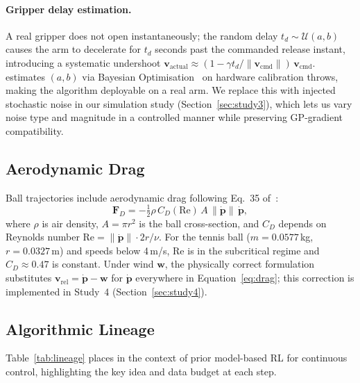 \paragraph{Gripper delay estimation.}
A real gripper does not open instantaneously; the random delay $t_d \sim \mathcal{U}(a,b)$
causes the arm to decelerate for $t_d$ seconds past the commanded release instant,
introducing a systematic undershoot $\mathbf{v}_{\mathrm{actual}} \approx
(1 - \gamma t_d / \|\mathbf{v}_{\mathrm{cmd}}\|)\,\mathbf{v}_{\mathrm{cmd}}$.
\mcpilot{} estimates $(a, b)$ via Bayesian Optimisation~\cite{shahriari2016bo} on
hardware calibration throws, making the algorithm deployable on a real arm.
We replace this with injected stochastic noise in our simulation study
(Section~\ref{sec:study3}), which lets us vary noise type and magnitude in a controlled
manner while preserving GP-gradient compatibility.

\subsection{Aerodynamic Drag}
\label{sec:background:drag}

Ball trajectories include aerodynamic drag following Eq.~35 of~\cite{turcato2025mcpilot}:
\begin{equation}
  \mathbf{F}_D = -\tfrac{1}{2}\rho\, C_D(\mathrm{Re})\, A\,
    \|\dot{\mathbf{p}}\|\, \dot{\mathbf{p}},
  \label{eq:drag}
\end{equation}
where $\rho$ is air density, $A = \pi r^2$ is the ball cross-section, and $C_D$ depends
on Reynolds number $\mathrm{Re} = \|\dot{\mathbf{p}}\| \cdot 2r / \nu$.
For the tennis ball ($m = 0.0577$\,kg, $r = 0.0327$\,m) and speeds below 4\,m/s, $\mathrm{Re}$
is in the subcritical regime and $C_D \approx 0.47$ is constant.
Under wind $\mathbf{w}$, the physically correct formulation substitutes
$\mathbf{v}_{\mathrm{rel}} = \dot{\mathbf{p}} - \mathbf{w}$ for $\dot{\mathbf{p}}$
everywhere in Equation~\eqref{eq:drag}; this correction is implemented in
Study~4 (Section~\ref{sec:study4}).

\subsection{Algorithmic Lineage}
\label{sec:background:lineage}

Table~\ref{tab:lineage} places \mcpilot{} in the context of prior model-based RL for
continuous control, highlighting the key idea and data budget at each step.


